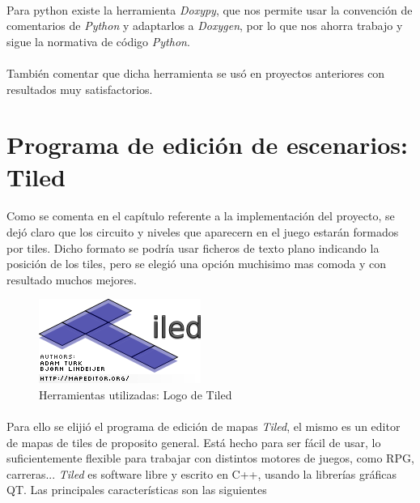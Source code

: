 \paragraph{}
Para python existe la herramienta \emph{Doxypy}, que nos permite usar la convención de comentarios de \emph{Python} y adaptarlos a
\emph{Doxygen}, por lo que nos ahorra trabajo y sigue la normativa de código \emph{Python}.

\paragraph{}
También comentar que dicha herramienta se usó en proyectos anteriores con resultados muy satisfactorios.

\section{Programa de edición de escenarios: Tiled}

\paragraph{}
Como se comenta en el capítulo referente a la implementación del proyecto, se dejó claro que los circuito y niveles que aparecern
en el juego estarán formados por tiles. Dicho formato se podría usar ficheros de texto plano indicando la posición de 
los tiles, pero se elegió una opción muchisimo mas comoda y con resultado muchos mejores.

\begin{figure}[H]
  \label{tiled_logo}
  \begin{center}
    \includegraphics[scale=1]{imagenes/tiled_logo.png}
  \end{center}
  \caption{Herramientas utilizadas: Logo de Tiled}
\end{figure}

\paragraph{}
Para ello se elijió el programa de edición de mapas \emph{Tiled}, el mismo es un editor de mapas de tiles de proposito general.
Está hecho para ser fácil de usar, lo suficientemente flexible para trabajar con distintos motores de juegos, como RPG, carreras... 
\emph{Tiled} es software libre y escrito en C++, usando la librerías gráficas QT. Las principales características son las siguientes


